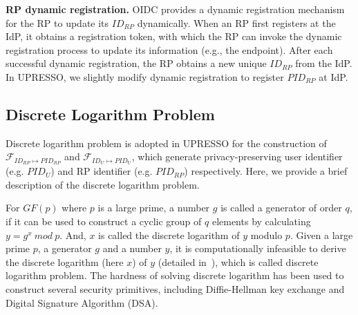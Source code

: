 \noindent\textbf{RP dynamic registration.} OIDC provides a dynamic registration mechanism~\cite{DynamicRegistration} for the RP to update its $ID_{RP}$ dynamically.
When an RP first registers at the IdP, it obtains a registration token, with which the  RP can invoke the dynamic registration process to
update its information (e.g., the endpoint).
After each successful dynamic registration, the RP obtains a new unique $ID_{RP}$ from the IdP.
In UPRESSO, we slightly modify dynamic registration to register $PID_{RP}$ at IdP.


\subsection{Discrete Logarithm Problem}
\label{sec:dlp}
Discrete logarithm problem is adopted in UPRESSO for the construction of $\mathcal{F}_{ID_{RP} \mapsto PID_{RP}}$ and $\mathcal{F}_{ID_{U} \mapsto PID_{U}}$,
 which generate privacy-preserving user identifier (e.g. $PID_U$) and RP identifier (e.g. $PID_{RP}$) respectively.
Here, we provide a brief description of the discrete logarithm problem.

For $GF(p)$ where $p$ is a large prime, a number $g$ is called a generator of order $q$, if it can be used to construct a cyclic  group of $q$ elements by calculating $y=g^x \ mod\ p$.
And, $x$ is called the discrete logarithm of $y$ modulo $p$. Given a large prime $p$, a generator $g$ and a number $y$, it is computationally infeasible to derive the discrete logarithm (here $x$) of $y$ (detailed in~\cite{WXWM}), which is called discrete logarithm problem.
The hardness of solving discrete logarithm has been used to construct several security primitives, including Diffie-Hellman key exchange and Digital Signature Algorithm (DSA).




